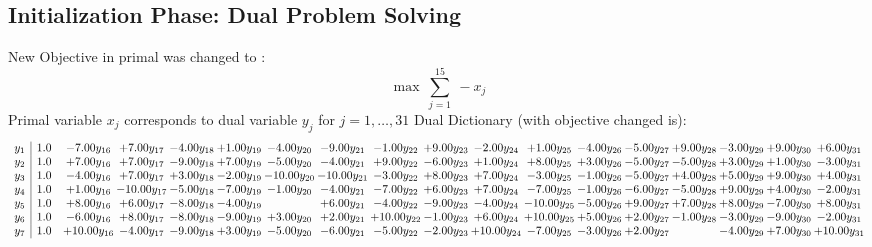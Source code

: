 \documentclass[9pt]{article}
\begin{document}
\subsection{Initialization Phase: Dual Problem Solving}
New Objective in primal was changed to : \[ \max\ \sum_{j=1}^{15}\ - x_j \] 
Primal variable $x_j$ corresponds to dual variable $y_j$ for $j = 1,\ldots,31$
Dual Dictionary (with objective changed is): 
\[\begin{array}{c| c c@{\hskip 2pt} c@{\hskip 2pt} c@{\hskip 2pt} c@{\hskip 2pt} c@{\hskip 2pt} c@{\hskip 2pt} c@{\hskip 2pt} c@{\hskip 2pt} c@{\hskip 2pt} c@{\hskip 2pt} c@{\hskip 2pt} c@{\hskip 2pt} c@{\hskip 2pt} c@{\hskip 2pt} c@{\hskip 2pt} c@{\hskip 2pt} }
 y_{1}   &  1.0 & -7.00 y_{16} & +  7.00 y_{17} & -4.00 y_{18} & +  1.00 y_{19} & -4.00 y_{20} & -9.00 y_{21} & -1.00 y_{22} & +  9.00 y_{23} & -2.00 y_{24} & +  1.00 y_{25} & -4.00 y_{26} & -5.00 y_{27} & +  9.00 y_{28} & -3.00 y_{29} & +  9.00 y_{30} & +  6.00 y_{31}\\
 y_{2}   &  1.0 & +  7.00 y_{16} & +  7.00 y_{17} & -9.00 y_{18} & +  7.00 y_{19} & -5.00 y_{20} & -4.00 y_{21} & +  9.00 y_{22} & -6.00 y_{23} & +  1.00 y_{24} & +  8.00 y_{25} & +  3.00 y_{26} & -5.00 y_{27} & -5.00 y_{28} & +  3.00 y_{29} & +  1.00 y_{30} & -3.00 y_{31}\\
 y_{3}   &  1.0 & -4.00 y_{16} & +  7.00 y_{17} & +  3.00 y_{18} & -2.00 y_{19} & -10.00 y_{20} & -10.00 y_{21} & -3.00 y_{22} & +  8.00 y_{23} & +  7.00 y_{24} & -3.00 y_{25} & -1.00 y_{26} & -5.00 y_{27} & +  4.00 y_{28} & +  5.00 y_{29} & +  9.00 y_{30} & +  4.00 y_{31}\\
 y_{4}   &  1.0 & +  1.00 y_{16} & -10.00 y_{17} & -5.00 y_{18} & -7.00 y_{19} & -1.00 y_{20} & -4.00 y_{21} & -7.00 y_{22} & +  6.00 y_{23} & +  7.00 y_{24} & -7.00 y_{25} & -1.00 y_{26} & -6.00 y_{27} & -5.00 y_{28} & +  9.00 y_{29} & +  4.00 y_{30} & -2.00 y_{31}\\
 y_{5}   &  1.0 & +  8.00 y_{16} & +  6.00 y_{17} & -8.00 y_{18} & -4.00 y_{19} &   & +  6.00 y_{21} & -4.00 y_{22} & -9.00 y_{23} & -4.00 y_{24} & -10.00 y_{25} & -5.00 y_{26} & +  9.00 y_{27} & +  7.00 y_{28} & +  8.00 y_{29} & -7.00 y_{30} & +  8.00 y_{31}\\
 y_{6}   &  1.0 & -6.00 y_{16} & +  8.00 y_{17} & -8.00 y_{18} & -9.00 y_{19} & +  3.00 y_{20} & +  2.00 y_{21} & + 10.00 y_{22} & -1.00 y_{23} & +  6.00 y_{24} & + 10.00 y_{25} & +  5.00 y_{26} & +  2.00 y_{27} & -1.00 y_{28} & -3.00 y_{29} & -9.00 y_{30} & -2.00 y_{31}\\
 y_{7}   &  1.0 & + 10.00 y_{16} & -4.00 y_{17} & -9.00 y_{18} & +  3.00 y_{19} & -5.00 y_{20} & -6.00 y_{21} & -5.00 y_{22} & -2.00 y_{23} & + 10.00 y_{24} & -7.00 y_{25} & -3.00 y_{26} & +  2.00 y_{27} &   & -4.00 y_{29} & +  7.00 y_{30} & + 10.00 y_{31}\\

\end{array}\]
\end{document}

